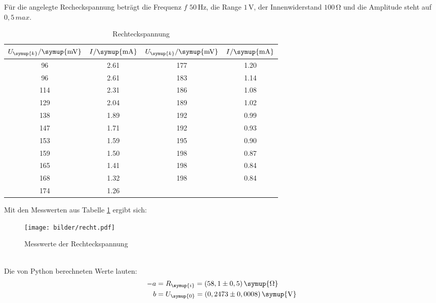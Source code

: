 Für die angelegte Recheckspannung beträgt die Frequenz $f$ $50\,\si{\hertz}$,
die Range $1 \,\si{\volt}$, der Innenwiderstand $100\,\si{\ohm}$ und die Amplitude
steht auf $0,5 \, max$.
\begin{table}[H]
  \centering
  \begin{tabular}{c c c c}
    \toprule
    $U_{\symup{k}}/\symup{\si{\milli\volt}}$ & $I/\symup{\si{\milli\ampere}}$  &
    $U_{\symup{k}}/\symup{\si{\milli\volt}}$ & $I/\symup{\si{\milli\ampere}}$  \\
    \midrule
     96   &  2.61  &  177  &  1.20  \\
     96   &  2.61  &  183  &  1.14  \\
    114   &  2.31  &  186  &  1.08  \\
    129   &  2.04  &  189  &  1.02  \\
    138   &  1.89  &  192  &  0.99  \\
    147   &  1.71  &  192  &  0.93  \\
    153   &  1.59  &  195  &  0.90  \\
    159   &  1.50  &  198  &  0.87  \\
    165   &  1.41  &  198  &  0.84  \\
    168   &  1.32  &  198  &  0.84  \\
    174   &  1.26  &  \hrulefill  & \hrulefill  \\
    \bottomrule
  \end{tabular}
  \caption{Rechteckspannung}
  \label{tab:recht}
\end{table}
Mit den Messwerten aus Tabelle \ref{tab:recht} ergibt sich:
\begin{figure}[h]
  \centering
  \texttt{[image: bilder/recht.pdf]}
  \caption{Messwerte der Rechteckspannung}
  \label{fig:re}
\end{figure}
\\
Die von Python berechneten Werte lauten:
\begin{align*}
   -a &= R_\symup{i} = (58,1 \pm 0,5)\, \symup{\si{\ohm}} \\ %
   b &= U_\symup{0} = (0,2473 \pm 0,0008)\,\symup{\si{\volt}}
\end{align*}
\newpage

